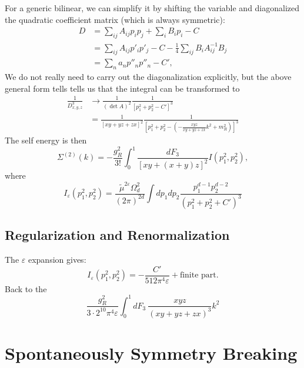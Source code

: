 For a generic bilinear, we can simplify it by shifting the variable and diagonalized the quadratic coefficient matrix (which is always symmetric):
\begin{equation}
\begin{aligned}
	D &= \sum_{ij} A_{ij} p_i p_j + \sum_i B_i p_i - C \\
	&= \sum_{ij} A_{ij}p'_i p'_j - C - \frac{1}{4} \sum_{ij} B_i A^{-1}_{ij} B_j \\
	&= \sum_n a_n p''_n p''_n - C',
\end{aligned}
\end{equation}
We do not really need to carry out the diagonalization explicitly, but the above general form tells tells us that the integral can be transformed to
\begin{equation}
\begin{aligned}
	\frac{1}{D_{x,y,z}^3} 
	&\rightarrow \frac{1}{(\det A)^2} \frac{1}{\left[p_1^2 + p_2^2 - C'\right]^3} \\
	&= \frac{1}{[xy+yz+zx]^2} \frac{1}{\left[ p_1^2+p_2^2 - \left(-\frac{xyz}{xy+yz+zx}k^2+m_R^2\right)\right]^3}
\end{aligned}
\end{equation}
The self energy is then
\begin{equation}
	\Sigma^{(2)}(k) = -\frac{g_R^2}{3!} \int_0^1 \frac{dF_3}{[xy+(x+y)z]^2} I(p_1^2,p_2^2), 
\end{equation}
where
\begin{equation}
	I_\varepsilon(p_1^2,p_2^2) = \frac{\tilde{\mu}^{2\varepsilon}\Omega_d^2}{(2\pi)^{2d}} \int dp_1 dp_2 \frac{p_1^{d-1} p_2^{d-2}}{(p_1^2+p_2^2+C')^3}
\end{equation}

\subsection{Regularization and Renormalization}
The $\varepsilon$ expansion gives:
\begin{equation}
	I_\varepsilon(p_1^2,p_2^2) = -\frac{C'}{512 \pi^4 \varepsilon} + \text{finite part}.
\end{equation}
Back to the 
\begin{equation}
	\frac{g_R^2}{3\cdot 2^{10} \pi^4 \varepsilon} \int_0^1 dF_3\ \frac{xyz}{(xy+yz+zx)^3} k^2
\end{equation}


\section{Spontaneously Symmetry Breaking}




